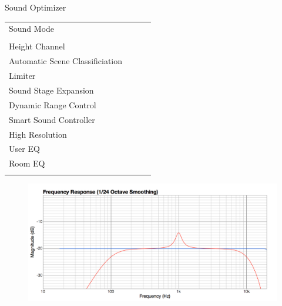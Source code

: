 \documentclass{beamer}
\begin{document}
\begin{frame}[t]{Sound Optimizer}
\begin{tiny}
\begin{tabular}{@{}lccc@{}}
				Sound Mode & \color{black}{Off} & & \\
				\color{blue}{Sound Optimizer} & \color{blue}{On} & & \\
				Height Channel & \color{black}{Off} & & \\
				Automatic Scene Classificiation & \color{black}{Off} & & \\
				Limiter & \color{black}{Off} & & \\
				Sound Stage Expansion & \color{black}{Off} & & \\
				Dynamic Range Control & \color{black}{Off} & & \\
				Smart Sound Controller & \color{black}{Off} & & \\
				High Resolution & \color{black}{Off} & & \\
				User EQ & \color{black}{Off} & & \\
				Room EQ & \color{black}{Off} & & \\
				\color{blue}{OSD Volume} & \color{blue}{On} &  \color{blue}{Vol.40} & \\
				\midrule
			\end{tabular}
		\end{tiny}
		
		\begin{figure}[b]
			\includegraphics[height=0.32\textwidth]{figure/soundoptimizer.png}
		\end{figure}
		
	\end{frame}
	
\end{document}
